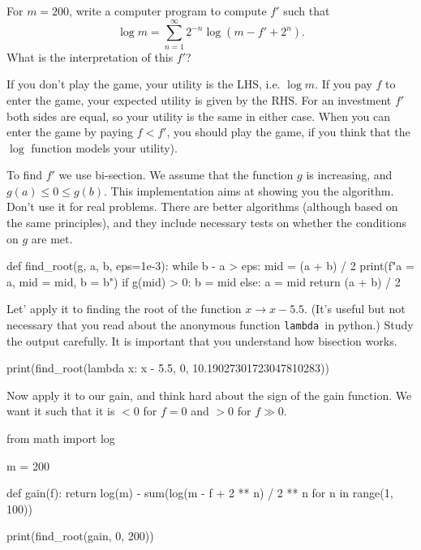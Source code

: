 \documentclass[lectures]{subfiles}
\begin{document}
\begin{exercise}
For $m=200$, write a computer program to compute $f'$ such that
\begin{equation}
  \label{eq:6}
\log m =  \sum_{n=1}^{\infty} 2^{-n}\log(m - f' + 2^{n}).
 \end{equation}
What is the interpretation of this $f'$?
\begin{solution}
  If you don't play the game, your utility is the LHS, i.e. $\log m$.
  If you pay $f$ to enter the game, your expected utility is given by the RHS.
  For an investment $f'$ both sides are equal, so your utility is the same in either case.
  When you can enter the game by paying $f<f'$, you should play the game, if you think that the $\log$ function models your utility).


  To find $f'$ we use bi-section.
  We assume that the function $g$ is increasing, and $g(a) \leq 0 \leq g(b)$.
  This implementation aims at showing you the algorithm.
  Don't use it for real problems.
  There are better algorithms (although based on the same principles), and they include necessary tests on whether the conditions on $g$ are met.

\begin{samepage}
\begin{pyblock}
def find_root(g, a, b, eps=1e-3):
    while b - a > eps:
        mid = (a + b) / 2
        print(f"a = {a}, mid = {mid}, b = {b}\n")
        if g(mid) > 0:
            b = mid
        else:
            a = mid
    return (a + b) / 2
\end{pyblock}
\end{samepage}


Let' apply it to finding the root of the function $x\to x-5.5$.
(It's useful but not necessary that you read about the anonymous function \texttt{lambda }in python.)
Study the output carefully.
It is important that you understand how bisection works.
\begin{pyblock}
print(find_root(lambda x: x - 5.5, 0, 10.19027301723047810283))
\end{pyblock}

\printpythontex

\begin{samepage}

Now apply it to our gain, and think hard about the sign of the gain function. We want it such that it is $<0$ for $f=0$ and $>0$ for $f\gg 0$.
\begin{pyblock}
from math import log

m = 200

def gain(f):
    return log(m) - sum(log(m - f + 2 ** n) / 2 ** n for n in range(1, 100))


print(find_root(gain, 0, 200))
\end{pyblock}

\end{samepage}

\printpythontex

\end{solution}
\end{exercise}
\end{document}
